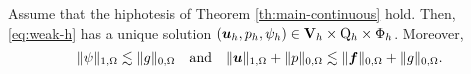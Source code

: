 \begin{theorem}\label{th:main-discrete}
Assume that the hiphotesis of Theorem \ref{th:main-continuous} hold. Then,  \eqref{eq:weak-h} has a unique solution $(\boldsymbol{u}_h, p_h, \psi_h) \in \mathbf{V}_h \times \mathrm{Q}_h \times \Phi_h$. %
Moreover, 
\begin{equation}\label{eq:stability-h}
\|\psi\|_{1,\Omega} \lesssim 
\|g\|_{0,\Omega} \qan \|\bu\|_{1,\Omega} + \|p\|_{0,\Omega} \lesssim %
 \|\ff\|_{0,\Omega} + \| g\|_{0,\Omega} %
 .
\end{equation}
\end{theorem}

